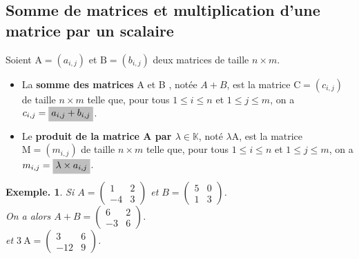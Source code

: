 \documentclass[12pt]{article}
\newcommand{\hideM}[1]{\mbox{\vphantom{$#1$}\smash{\colorbox{gray!50}{$\displaystyle #1$}}} }
\theoremstyle{break}
\newtheorem*{example}{Exemple.}
\begin{document}
\subsection{Somme de matrices et multiplication d'une matrice par un scalaire}
\begin{definition}{}{}
Soient $\mathrm{A}=\left(a_{i, j}\right)$ et $\mathrm{B}=\left(b_{i, j}\right)$ deux matrices de taille $n \times m$.

\begin{itemize}[noitemsep,topsep=0pt]
  \item La \textbf{somme des matrices} A et B , notée $A+B$, est la matrice $\mathrm{C}=\left(c_{i, j}\right)$ de taille $n \times m$ telle que, pour tous $1 \leqslant i \leqslant n$ et $1 \leqslant j \leqslant m$, on a $c_{i, j}=\hideM{a_{i, j}+b_{i, j}}$.
  \item Le \textbf{produit de la matrice A par $\lambda \in \mathbb{K}$}, noté $\lambda \mathrm{A}$, est la matrice $\mathrm{M}=\left(m_{i, j}\right)$ de taille $n \times m$ telle que, pour tous $1 \leqslant i \leqslant n$ et $1 \leqslant j \leqslant m$, on a $m_{i, j}=\hideM{\lambda \times a_{i, j}}$.
\end{itemize}
\end{definition}

\begin{example}
Si $A=\left(\begin{array}{cc}1 & 2 \\ -4 & 3\end{array}\right)$ et $B=\left(\begin{array}{ll}5 & 0 \\ 1 & 3\end{array}\right)$.\\
On a alors $A+B=\left(\begin{array}{cc}6 & 2 \\ -3 & 6\end{array}\right)$.\\
et $3 \mathrm{~A}=\left(\begin{array}{cc}3 & 6 \\ -12 & 9\end{array}\right)$.
\end{example}
\end{document}
